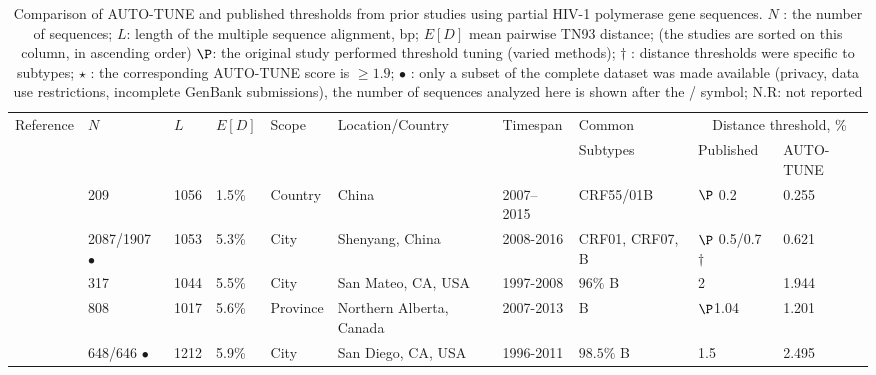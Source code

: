 \documentclass[utf8]{FrontiersinHarvard} %
\begin{document}
\begin{table}[h!]
	\caption{Comparison of AUTO-TUNE and published thresholds from prior studies using partial HIV-1 polymerase gene sequences. $N$ : the number of sequences; $L$: length of the multiple sequence alignment, bp; $E[D]$ mean pairwise TN93 distance; (the studies are sorted on this column, in ascending order) $\P$: the original study performed threshold tuning (varied methods); $\dagger$ : distance thresholds were specific to subtypes; $\star$ : the corresponding AUTO-TUNE score is $\geq 1.9$; $\bullet$ : only a subset of the complete dataset was made available (privacy, data use restrictions, incomplete GenBank submissions), the number of  sequences analyzed here is shown after the / symbol; N.R: not reported}
  \label{tab:paperComparison}

	\vspace{10pt}
	\centering
	\begin{ssmall}
		\begin{tabular}{llllllllll}
			\hline
			Reference                   & $N$                 & $L$  & $E[D]$ & Scope      & Location/Country         & Timespan  & Common                & \multicolumn{2}{c}{Distance threshold, \%}                  \\
			                            &                     &      &        &            &                          &           & Subtypes              & Published                                  & AUTO-TUNE      \\
			\hline
			\cite{Zai:2020aa}           & 209                 & 1056 & 1.5\%  & Country    & China                    & 2007–2015 & CRF55/01B             & $\P$ 0.2                                   & 0.255          \\
			\cite{liu_dynamics_2020}    & 2087/1907 $\bullet$ & 1053 & 5.3\%  & City       & Shenyang, China          & 2008-2016 & CRF01, CRF07, B       & $\P$ 0.5/0.7 $\dagger$                     & 0.621          \\
			\cite{dalai_combining_2018} & 317                 & 1044 & 5.5\%  & City       & San Mateo, CA, USA       & 1997-2008 & $96\%$ B              & 2                                          & 1.944          \\
			\cite{chato_public_2020}    & 808                 & 1017 & 5.6\%  & Province   & Northern Alberta, Canada & 2007-2013 & B                     & $\P$1.04                                   & 1.201          \\
			\cite{Little:2014aa}        & 648/646 $\bullet$   & 1212 & 5.9\%  & City       & San Diego, CA, USA       & 1996-2011 & $98.5\%$ B            & 1.5                                        & 2.495          \\

\end{tabular}
\end{ssmall}
\end{table}
\end{document}
